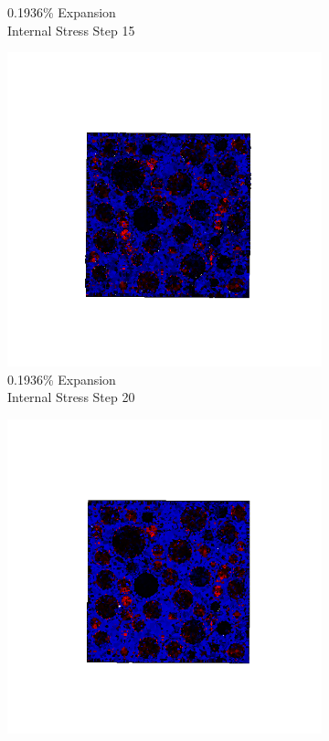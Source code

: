 \begin{figure}[h!]
\begin{subfigure}{.25\textwidth}
      \caption{0.1936\% Expansion\\Internal Stress Step 15}
    \end{subfigure}%
    \begin{subfigure}{.25\textwidth}
      \centering
      \includegraphics[width=1.0\linewidth]{Files/exp_3D/ASR/A30P75_2_stress.png}
      \caption{0.1936\% Expansion\\Internal Stress Step 20}
    \end{subfigure}
    \begin{subfigure}{.25\textwidth}
      \centering
      \includegraphics[width=1.0\linewidth]{Files/exp_3D/ASR/A30P75_3_s5.png}

\end{subfigure}
\end{figure}
